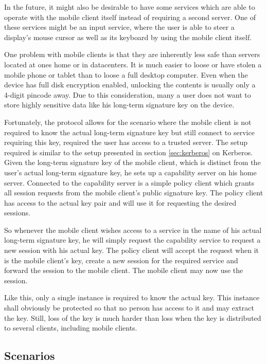 In the future, it might also be desirable to have some services which are able to operate with the mobile client itself instead of requiring a second server.
One of these services might be an input service, where the user is able to steer a display's mouse cursor as well as its keyboard by using the mobile client itself.

\bigskip

One problem with mobile clients is that they are inherently less safe than servers located at ones home or in datacenters.
It is much easier to loose or have stolen a mobile phone or tablet than to loose a full desktop computer.
Even when the device has full disk encryption enabled, unlocking the contents is usually only a 4-digit pincode away.
Due to this consideration, many a user does not want to store highly sensitive data like his long-term signature key on the device.

Fortunately, the protocol allows for the scenario where the mobile client is not required to know the actual long-term signature key but still connect to service requiring this key, required the user has access to a trusted server.
The setup required is similar to the setup presented in section \ref{sec:kerberos} on Kerberos.
Given the long-term signature key of the mobile client, which is distinct from the user's actual long-term signature key, he sets up a capability server on his home server.
Connected to the capability server is a simple policy client which grants all session requests from the mobile client's public signature key.
The policy client has access to the actual key pair and will use it for requesting the desired sessions.

So whenever the mobile client wishes access to a service in the name of his actual long-term signature key, he will simply request the capability service to request a new session with his actual key.
The policy client will accept the request when it is the mobile client's key, create a new session for the required service and forward the session to the mobile client.
The mobile client may now use the session.

Like this, only a single instance is required to know the actual key.
This instance shall obviously be protected so that no person has access to it and may extract the key.
Still, loss of the key is much harder than loss when the key is distributed to several clients, including mobile clients.

\subsection{Scenarios}

